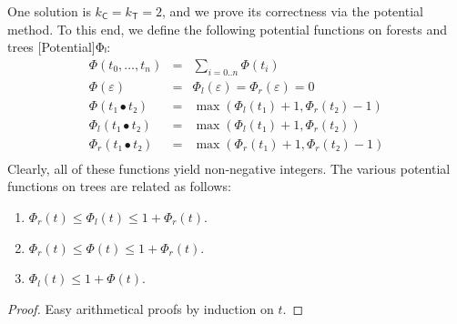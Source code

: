 \documentclass[svgnames,dvipsnames,table,review%
]{jfp-epi}
\newcommand{\tC}{\ensuremath{\mathsf{C}}}
\newcommand{\tT}{\ensuremath{\mathsf{T}}}
\begin{document}
One solution is $k_\tC = k_\tT = 2$, and we prove its correctness via the potential method.
To this end, we define the following potential functions on forests 
and trees [Potential]{Φₗ}:
\[
\begin{array}{lll}
\Phi(t_0,\dots,t_n) & = & \sum_{i=0..n} \Phi(t_i) \\
\Phi(\varepsilon)   & = & \Phi_l(\varepsilon) = \Phi_r(\varepsilon) = 0 \\
\Phi(t₁ ∙ t₂)       & = & \max (\Phi_l(t₁)+1, \Phi_r(t₂)-1) \\
\Phi_l(t₁ ∙ t₂)     & = & \max (\Phi_l(t₁)+1, \Phi_r(t₂)) \\
\Phi_r(t₁ ∙ t₂)     & = & \max (\Phi_r(t₁)+1, \Phi_r(t₂)-1) \\
\end{array}
\]
Clearly, all of these functions yield non-negative integers.
The various potential functions on trees are related as follows:
\begin{lemma} \hfill
  \label{lem:phi}
  \begin{enumerate}
  \item $\Phi_r(t) \leq \Phi_l(t) \leq 1 + \Phi_r(t)$. 
  \item $\Phi_r(t) \leq \Phi(t) \leq 1 + \Phi_r(t)$.   
  \item $\Phi_l(t) \leq 1 + \Phi(t)$.                  
  \end{enumerate}
\end{lemma}
\begin{proof}
  Easy arithmetical proofs by induction on $t$.
\end{proof}
\end{document}
